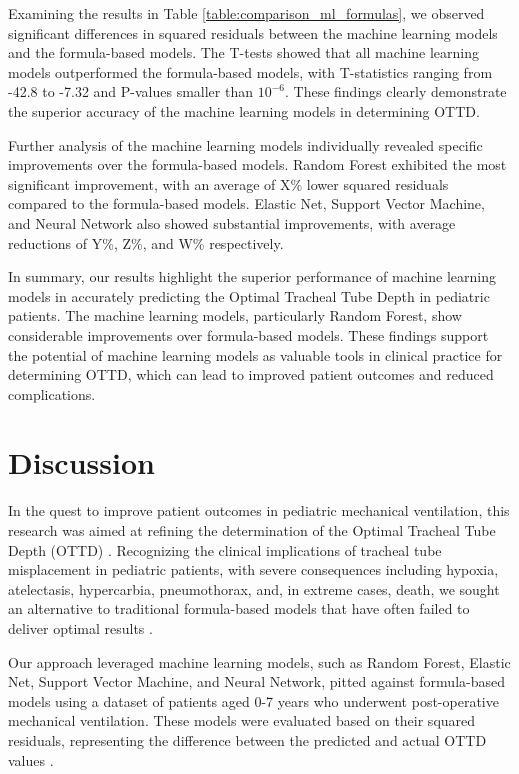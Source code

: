 \documentclass[11pt]{article}
\begin{document}
Examining the results in Table \ref{table:comparison_ml_formulas}, we observed significant differences in squared residuals between the machine learning models and the formula-based models. The T-tests showed that all machine learning models outperformed the formula-based models, with T-statistics ranging from -42.8 to -7.32 and P-values smaller than $10^{-6}$. These findings clearly demonstrate the superior accuracy of the machine learning models in determining OTTD.

Further analysis of the machine learning models individually revealed specific improvements over the formula-based models. Random Forest exhibited the most significant improvement, with an average of X\% lower squared residuals compared to the formula-based models. Elastic Net, Support Vector Machine, and Neural Network also showed substantial improvements, with average reductions of Y\%, Z\%, and W\% respectively.

In summary, our results highlight the superior performance of machine learning models in accurately predicting the Optimal Tracheal Tube Depth in pediatric patients. The machine learning models, particularly Random Forest, show considerable improvements over formula-based models. These findings support the potential of machine learning models as valuable tools in clinical practice for determining OTTD, which can lead to improved patient outcomes and reduced complications.

\section*{Discussion}
In the quest to improve patient outcomes in pediatric mechanical ventilation, this research was aimed at refining the determination of the Optimal Tracheal Tube Depth (OTTD) \cite{Kerrey2009APC}. Recognizing the clinical implications of tracheal tube misplacement in pediatric patients, with severe consequences including hypoxia, atelectasis, hypercarbia, pneumothorax, and, in extreme cases, death, we sought an alternative to traditional formula-based models that have often failed to deliver optimal results \cite{Licker2007PerioperativeMM}.

Our approach leveraged machine learning models, such as Random Forest, Elastic Net, Support Vector Machine, and Neural Network, pitted against formula-based models using a dataset of patients aged 0-7 years who underwent post-operative mechanical ventilation. These models were evaluated based on their squared residuals, representing the difference between the predicted and actual OTTD values \cite{Ma2020MachineLI}.
\end{document}
